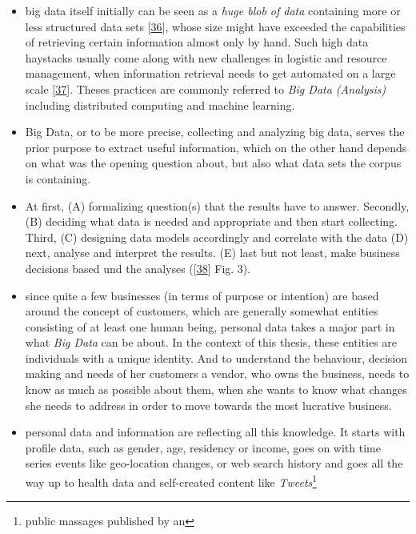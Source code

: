 \documentclass[12pt,english,a4paper,titlepage,cleardoublepage=empty,dottedtoc]{report}
\begin{document}
\begin{itemize}
\item
  big data itself initially can be seen as a \emph{huge blob of data}
  containing more or less structured data sets
  {[}\protect\hyperlink{ref-web_2016_oxford_definition_big-data}{36}{]},
  whose size might have exceeded the capabilities of retrieving certain
  information almost only by hand. Such high data haystacks usually come
  along with new challenges in logistic and resource management, when
  information retrieval needs to get automated on a large scale
  {[}\protect\hyperlink{ref-web_2016_wikipedia_definition_big-data}{37}{]}.
  Theses practices are commonly referred to \emph{Big Data (Analysis)}
  including distributed computing and machine learning.
\item
  Big Data, or to be more precise, collecting and analyzing big data,
  serves the prior purpose to extract useful information, which on the
  other hand depends on what was the opening question about, but also
  what data sets the corpus is containing.
\item
  At first, (A) formalizing question(s) that the results have to answer.
  Secondly, (B) deciding what data is needed and appropriate and then
  start collecting. Third, (C) designing data models accordingly and
  correlate with the data (D) next, analyse and interpret the results.
  (E) last but not least, make business decisions based und the analyses
  ({[}\protect\hyperlink{ref-paper_2015_big-data-analytics_a-survey}{38}{]}
  Fig. 3).
\item
  since quite a few businesses (in terms of purpose or intention) are
  based around the concept of customers, which are generally somewhat
  entities consisting of at least one human being, personal data takes a
  major part in what \emph{Big Data} can be about. In the context of
  this thesis, these entities are individuals with a unique identity.
  And to understand the behaviour, decision making and needs of her
  customers a vendor, who owns the business, needs to know as much as
  possible about them, when she wants to know what changes she needs to
  address in order to move towards the most lucrative business.
\item
  personal data and information are reflecting all this knowledge. It
  starts with profile data, such as gender, age, residency or income,
  goes on with time series events like geo-location changes, or web
  search history and goes all the way up to health data and self-created
  content like \emph{Tweets}\footnote{public massages published by an
}
\end{itemize}
\end{document}
